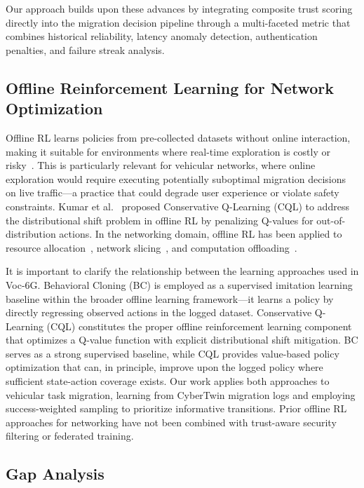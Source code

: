 \documentclass[journal,twoside]{IEEEtran}
\newcommand{\VocSixG}{Voc-6G}
\begin{document}
Our approach builds upon these advances by integrating composite trust scoring directly into the migration decision pipeline through a multi-faceted metric that combines historical reliability, latency anomaly detection, authentication penalties, and failure streak analysis.

\subsection{Offline Reinforcement Learning for Network Optimization}

Offline RL learns policies from pre-collected datasets without online interaction, making it suitable for environments where real-time exploration is costly or risky~\cite{levine2020offline, fujimoto2019off}. This is particularly relevant for vehicular networks, where online exploration would require executing potentially suboptimal migration decisions on live traffic---a practice that could degrade user experience or violate safety constraints. Kumar et al.~\cite{kumar2020cql} proposed Conservative Q-Learning (CQL) to address the distributional shift problem in offline RL by penalizing Q-values for out-of-distribution actions. In the networking domain, offline RL has been applied to resource allocation~\cite{wang2021offline}, network slicing~\cite{wang2021intelligent}, and computation offloading~\cite{chen2021offline}.

It is important to clarify the relationship between the learning approaches used in \VocSixG{}. Behavioral Cloning (BC) is employed as a supervised imitation learning baseline within the broader offline learning framework---it learns a policy by directly regressing observed actions in the logged dataset. Conservative Q-Learning (CQL) constitutes the proper offline reinforcement learning component that optimizes a Q-value function with explicit distributional shift mitigation. BC serves as a strong supervised baseline, while CQL provides value-based policy optimization that can, in principle, improve upon the logged policy where sufficient state-action coverage exists. Our work applies both approaches to vehicular task migration, learning from CyberTwin migration logs and employing success-weighted sampling to prioritize informative transitions. Prior offline RL approaches for networking have not been combined with trust-aware security filtering or federated training.

\subsection{Gap Analysis}
\end{document}
